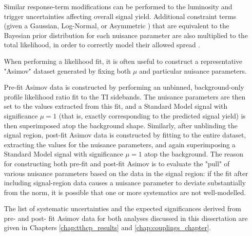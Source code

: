 Similar response-term modifications can be performed to the luminosity and trigger uncertainties affecting overall signal yield. Additional constraint terms (given a Gaussian, Log-Normal, or Asymmetric \cite{Cranmer}) that are equivalent to the Bayesian prior distribution for each nuisance parameter are also multiplied to the total likelihood, in order to correctly model their allowed spread \cite{JSConway}.

When performing a likelihood fit, it is often useful to construct a representative "Asimov" dataset generated by fixing both $\mu$ and particular nuisance parameters.

Pre-fit Asimov data is constructed by performing an unbinned, background-only profile likelihood ratio fit to the TI sidebands. The nuisance parameters are then set to the values extracted from this fit, and a Standard Model signal with significance $\mu = 1$ (that is, exactly corresponding to the predicted signal yield) is then superimposed atop the background shape. Similarly, after unblinding the signal region, post-fit Asimov data is constructed by fitting to the entire dataset, extracting the values for the nuisance parameters, and again superimposing a Standard Model signal with significance $\mu = 1$ atop the background. The reason for constructing both pre-fit and post-fit Asimov is to evaluate the "pull" of various nuisance parameters based on the data in the signal region: if the fit after including signal-region data causes a nuisance parameter to deviate substantially from the norm, it is possible that one or more systematics are not well-modelled.

The list of systematic uncertainties and the expected significances derived from pre- and post- fit Asimov data for both analyses discussed in this dissertation are given in Chapters \ref{chap:tthcp_results} and \ref{chap:couplings_chapter}.
